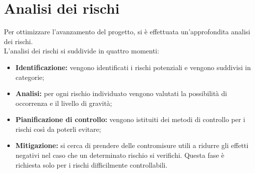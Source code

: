 \section{Analisi dei rischi}
Per ottimizzare l'avanzamento del progetto, si è effettuata un'approfondita analisi dei
rischi. \\
L'analisi dei rischi si suddivide in quattro momenti: \\
\begin{itemize}
	\item \textbf{Identificazione:} vengono identificati i rischi potenziali e vengono suddivisi in categorie;
	\item \textbf{Analisi:} per ogni rischio individuato vengono valutati la possibilità di occorrenza e il livello di gravità;
	\item \textbf{Pianificazione di controllo:} vengono istituiti dei metodi di controllo per i rischi così da poterli evitare;
	\item \textbf{Mitigazione:} si cerca di prendere delle contromisure utili a ridurre gli effetti negativi nel caso che un determinato rischio si verifichi. Questa fase è richiesta solo per i rischi difficilmente controllabili. \\
\end{itemize}
\def\arraystretch{1.5}
